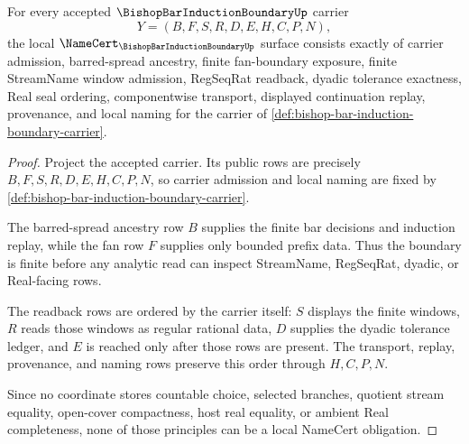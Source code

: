 \begin{theorem}
\label{thm:bishop-bar-induction-boundary-namecert-obligations}
For every accepted $\BishopBarInductionBoundaryUp$ carrier
$$
Y=(B,F,S,R,D,E,H,C,P,N),
$$
the local $\NameCert_{\BishopBarInductionBoundaryUp}$ surface consists exactly of carrier admission, barred-spread ancestry, finite fan-boundary exposure, finite StreamName window admission, RegSeqRat readback, dyadic tolerance exactness, Real seal ordering, componentwise transport, displayed continuation replay, provenance, and local naming for the carrier of \autoref{def:bishop-bar-induction-boundary-carrier}.
\end{theorem}
\begin{proof}
Project the accepted carrier. Its public rows are precisely $B,F,S,R,D,E,H,C,P,N$, so carrier admission and local naming are fixed by \autoref{def:bishop-bar-induction-boundary-carrier}.

The barred-spread ancestry row $B$ supplies the finite bar decisions and induction replay, while the fan row $F$ supplies only bounded prefix data. Thus the boundary is finite before any analytic read can inspect StreamName, RegSeqRat, dyadic, or Real-facing rows.

The readback rows are ordered by the carrier itself: $S$ displays the finite windows, $R$ reads those windows as regular rational data, $D$ supplies the dyadic tolerance ledger, and $E$ is reached only after those rows are present. The transport, replay, provenance, and naming rows preserve this order through $H,C,P,N$.

Since no coordinate stores countable choice, selected branches, quotient stream equality, open-cover compactness, host real equality, or ambient Real completeness, none of those principles can be a local NameCert obligation.
\end{proof}


